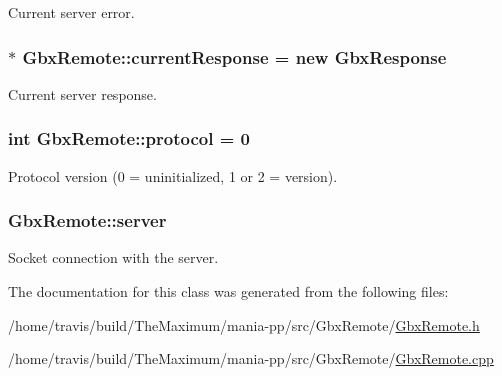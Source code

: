 Current server error. 

\hypertarget{classGbxRemote_a3a3a0af1a692a801a33baa292b877dc2}{
\subsubsection[{current\-Response}]{$\ast$ Gbx\-Remote\-::current\-Response = new {\bf Gbx\-Response}\hspace{0.3cm}{\ttfamily [private]}}}\label{classGbxRemote_a3a3a0af1a692a801a33baa292b877dc2}


Current server response. 

\hypertarget{classGbxRemote_a5ee5c7087085cb6cb2e7bc6135ff0646}{
\subsubsection[{protocol}]{\setlength{\rightskip}{0pt plus 5cm}int Gbx\-Remote\-::protocol = 0\hspace{0.3cm}{\ttfamily [private]}}}\label{classGbxRemote_a5ee5c7087085cb6cb2e7bc6135ff0646}


Protocol version (0 = uninitialized, 1 or 2 = version). 

\hypertarget{classGbxRemote_a0b0b212b945da4266fb645affdac81cb}{
\subsubsection[{server}]{ Gbx\-Remote\-::server\hspace{0.3cm}{\ttfamily [private]}}}\label{classGbxRemote_a0b0b212b945da4266fb645affdac81cb}


Socket connection with the server. 



The documentation for this class was generated from the following files\-:\begin{DoxyCompactItemize}
\item 
/home/travis/build/\-The\-Maximum/mania-\/pp/src/\-Gbx\-Remote/\hyperlink{GbxRemote_8h}{Gbx\-Remote.\-h}\item 
/home/travis/build/\-The\-Maximum/mania-\/pp/src/\-Gbx\-Remote/\hyperlink{GbxRemote_8cpp}{Gbx\-Remote.\-cpp}\end{DoxyCompactItemize}
